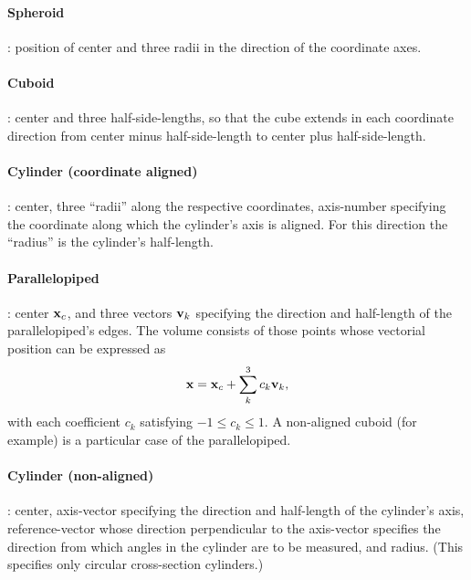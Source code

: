 \documentclass[12pt]{article}
\begin{document}
\paragraph{Spheroid}: position of center and three radii in the
direction of the coordinate axes.

\paragraph{Cuboid}: center and three half-side-lengths, so that the
cube extends in each coordinate direction from center minus
half-side-length to center plus half-side-length.

\paragraph{Cylinder (coordinate aligned)}: center, three ``radii''
along the respective coordinates, axis-number specifying the
coordinate along which the cylinder's axis is aligned. For this
direction the ``radius'' is the cylinder's half-length.

\paragraph{Parallelopiped}: center ${\bf x}_c$, and three vectors
${\bf v}_k$ specifying the
direction and half-length of the parallelopiped's edges. The volume
consists of those points whose vectorial position can be expressed as
\begin{equation}\label{parallelocoef}
{\bf x} = {\bf x}_c + \sum_k^3 c_k {\bf v}_k,  
\end{equation}
with each coefficient
$c_k$ satisfying $-1\le c_k \le 1$. A non-aligned cuboid (for example)
is a
particular case of the parallelopiped. 

\paragraph{Cylinder (non-aligned)}: center, axis-vector specifying the
direction and half-length of the cylinder's axis, reference-vector
whose direction perpendicular to the axis-vector specifies the
direction from which angles in the cylinder are to be measured, and
radius. (This specifies only circular cross-section cylinders.)
\end{document}
